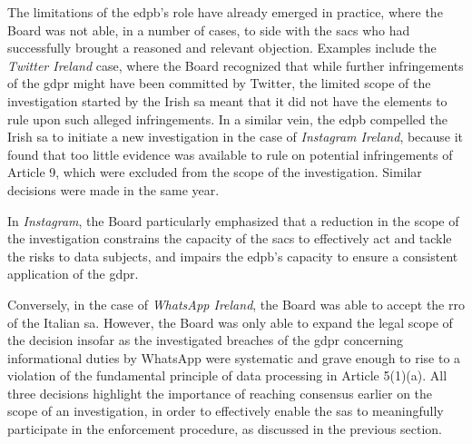 The limitations of the \gls{edpb}'s role have already emerged in practice, where the Board was not able, in a number of cases, to side with the \glspl{sac} who had successfully brought a reasoned and relevant objection.
Examples include the \emph{Twitter Ireland} case, where the Board recognized that while further infringements of the \gls{gdpr} might have been committed by Twitter, the limited scope of the investigation started by the Irish \gls{sa} meant that it did not have the elements to rule upon such alleged infringements.\autocite[132]{edpbTwitter}
In a similar vein, the \gls{edpb} compelled the Irish \gls{sa} to initiate a new investigation in the case of \emph{Instagram Ireland}, because it found that too little evidence was available to rule on potential infringements of Article 9, which were excluded from the scope of the investigation.\autocite[200--203]{edpbInstagram}
Similar decisions were made in the same year.\autocites[198]{edpbFacebook}[222]{edpbWhatsApp2}

In \emph{Instagram}, the Board particularly emphasized that a reduction in the scope of the investigation constrains the capacity of the \glspl{sac} to effectively act and tackle the risks to data subjects, and impairs the \gls{edpb}'s capacity to ensure a consistent application of the \gls{gdpr}.\autocite[200]{edpbInstagram}

Conversely, in the case of \emph{WhatsApp Ireland}, the Board was able to accept the \gls{rro} of the Italian \gls{sa}.\autocite[183--201]{edpbWhatsApp}
However, the Board was only able to expand the legal scope of the decision insofar as the investigated breaches of the \gls{gdpr} concerning informational duties by WhatsApp were systematic and grave enough to rise to a violation of the fundamental principle of data processing in Article 5(1)(a).\autocite[198--201]{edpbWhatsApp}
All three decisions highlight the importance of reaching consensus earlier on the scope of an investigation, in order to effectively enable the \glspl{sa} to meaningfully participate in the enforcement procedure, as discussed in the previous section.\autocites[132--136]{edpbTwitter}[225]{edpbWhatsApp}[200--203]{edpbInstagram}[468]{hofmannmustertScholtenHandbook2023}

